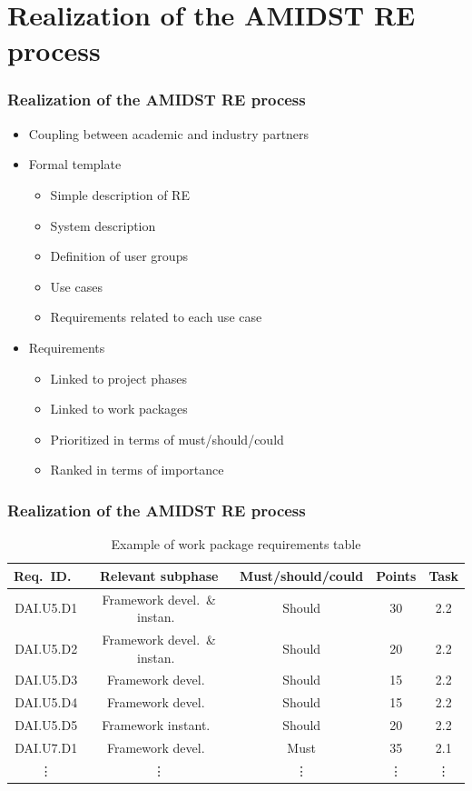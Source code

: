 \documentclass{beamer}
\begin{document}
\section{Realization of the AMIDST RE process}

\begin{frame} \frametitle{Realization of the AMIDST RE process} 
\vspace{-1cm}
\begin{itemize}
\item<1-> Coupling between academic and industry partners
\item<2-> Formal template
\begin{itemize}
\item<2-> Simple description of RE
\item<2-> System description
\item<2-> Definition of user groups
\item<2-> Use cases
\item<2-> Requirements related to each use case
\end{itemize}
\item<3-> Requirements
\begin{itemize}
\item<3-> Linked to project phases
\item<3-> Linked to work packages
\item<3-> Prioritized in terms of must/should/could
\item<3-> Ranked in terms of importance
\end{itemize}
\end{itemize}
\end{frame}

\begin{frame} \frametitle{Realization of the AMIDST RE process} 
\vspace{-1cm}
\scriptsize{
\begin{table}[htbp]
  \centering
  \begin{tabular}{|c|c|c|c|c|}
    \hline
    Req.\ ID.\ & Relevant subphase & Must/should/could & Points & Task \\ \hline\hline
    DAI.U5.D1 & Framework devel.\ \& instan.\ & Should & 30 & 2.2  \\
    DAI.U5.D2 & Framework devel.\ \& instan.\ & Should & 20 & 2.2  \\
    DAI.U5.D3 & Framework devel.\ & Should & 15 & 2.2  \\
    DAI.U5.D4 & Framework devel.\ & Should & 15 & 2.2  \\
    DAI.U5.D5 & Framework instant.\ & Should & 20 & 2.2  \\
    DAI.U7.D1 & Framework devel.\ & Must & 35 & 2.1 \\
   \vdots & \vdots  & \vdots & \vdots & \vdots \\ \hline\hline
  \end{tabular}
  \caption{Example of work package requirements table}
\end{table}
}
\end{frame}
\end{document}
